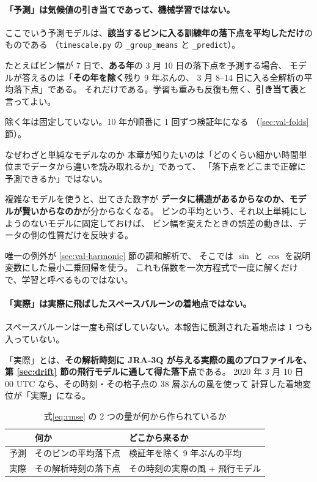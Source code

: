 \paragraph{「予測」は気候値の引き当てであって、機械学習ではない。}
ここでいう予測モデルは、\textbf{該当するビンに入る訓練年の落下点を平均しただけ}のものである
（\texttt{timescale.py} の \texttt{\_group\_means} と \texttt{\_predict}）。

たとえばビン幅が 7 日で、\textbf{ある年}の 3 月 10 日の落下点を予測する場合、
モデルが答えるのは「\textbf{その年を除く}残り 9 年ぶんの、
3 月 8--14 日に入る全解析の平均落下点」である。
それだけである。学習も重みも反復も無く、\textbf{引き当て表}と言ってよい。

除く年は固定していない。10 年が順番に 1 回ずつ検証年になる
（\ref{sec:val-folds} 節）。

\begin{whybox}{なぜわざと単純なモデルなのか}
本章が知りたいのは「どのくらい細かい時間単位までデータから違いを読み取れるか」であって、
「落下点をどこまで正確に予測できるか」ではない。

複雑なモデルを使うと、出てきた数字が
\textbf{データに構造があるからなのか、モデルが賢いからなのか}が分からなくなる。
ビンの平均という、それ以上単純にしようのないモデルに固定しておけば、
ビン幅を変えたときの誤差の動きは、データの側の性質だけを反映する。

唯一の例外が \ref{sec:val-harmonic} 節の調和解析で、
そこでは $\sin$ と $\cos$ を説明変数にした最小二乗回帰を使う。
これも係数を一次方程式で一度に解くだけで、学習と呼べるものではない。
\end{whybox}

\paragraph{「実際」は実際に飛ばしたスペースバルーンの着地点ではない。}
スペースバルーンは一度も飛ばしていない。本報告に観測された着地点は 1 つも入っていない。

「実際」とは、\textbf{その解析時刻に JRA-3Q が与える実際の風のプロファイルを、
第 \ref{sec:drift} 節の飛行モデルに通して得た落下点}である。
2020 年 3 月 10 日 00 UTC なら、その時刻・その格子点の 38 層ぶんの風を使って
計算した着地変位が「実際」になる。

\begin{table}[H]
\centering
\caption{式\eqref{eq:rmse} の 2 つの量が何から作られているか}
\label{tab:pred-vs-true}
\begin{tabular}{@{}lll@{}}
\toprule
 & 何か & どこから来るか \\
\midrule
予測 & そのビンの平均落下点 & 検証年を除く 9 年ぶんの平均 \\
実際 & その解析時刻の落下点 & その時刻の実際の風 $+$ 飛行モデル \\
\bottomrule
\end{tabular}
\end{table}


